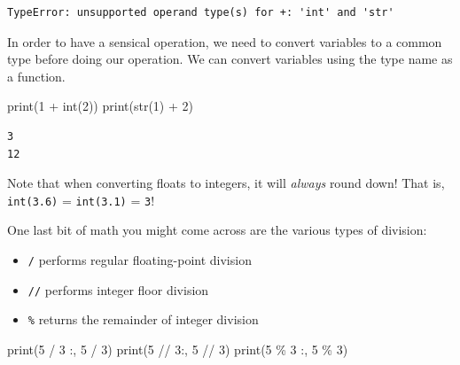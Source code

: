 \documentclass[
  letterpaper,
  DIV=11,
  numbers=noendperiod]{scrreprt}
\newenvironment{Shaded}{\begin{snugshade}}{\end{snugshade}}
\newcommand{\BuiltInTok}[1]{\textcolor[rgb]{0.00,0.23,0.31}{#1}}
\newcommand{\DecValTok}[1]{\textcolor[rgb]{0.68,0.00,0.00}{#1}}
\newcommand{\NormalTok}[1]{\textcolor[rgb]{0.00,0.23,0.31}{#1}}
\newcommand{\OperatorTok}[1]{\textcolor[rgb]{0.37,0.37,0.37}{#1}}
\newcommand{\StringTok}[1]{\textcolor[rgb]{0.13,0.47,0.30}{#1}}
\providecommand{\tightlist}{%
  \setlength{\itemsep}{0pt}\setlength{\parskip}{0pt}}\usepackage{longtable,booktabs,array}
\begin{document}
\begin{verbatim}
TypeError: unsupported operand type(s) for +: 'int' and 'str'
\end{verbatim}

In order to have a sensical operation, we need to convert variables to a
common type before doing our operation. We can convert variables using
the type name as a function.

\begin{Shaded}
\begin{Highlighting}[]
\BuiltInTok{print}\NormalTok{(}\DecValTok{1} \OperatorTok{+} \BuiltInTok{int}\NormalTok{(}\StringTok{\textquotesingle{}2\textquotesingle{}}\NormalTok{))}
\BuiltInTok{print}\NormalTok{(}\BuiltInTok{str}\NormalTok{(}\DecValTok{1}\NormalTok{) }\OperatorTok{+} \StringTok{\textquotesingle{}2\textquotesingle{}}\NormalTok{)}
\end{Highlighting}
\end{Shaded}

\begin{verbatim}
3
12
\end{verbatim}

\begin{tcolorbox}[enhanced jigsaw, rightrule=.15mm, opacitybacktitle=0.6, colback=white, toprule=.15mm, colframe=quarto-callout-tip-color-frame, bottomtitle=1mm, bottomrule=.15mm, arc=.35mm, coltitle=black, breakable, title=\textcolor{quarto-callout-tip-color}{\faLightbulb}\hspace{0.5em}{Int of a Float?}, titlerule=0mm, opacityback=0, colbacktitle=quarto-callout-tip-color!10!white, left=2mm, toptitle=1mm, leftrule=.75mm]
Note that when converting floats to integers, it will \emph{always}
round down! That is, \texttt{int(3.6)} = \texttt{int(3.1)} = \texttt{3}!
\end{tcolorbox}

One last bit of math you might come across are the various types of
division:

\begin{itemize}
\tightlist
\item
  \texttt{/} performs regular floating-point division
\item
  \texttt{//} performs integer floor division
\item
  \texttt{\%} returns the remainder of integer division
\end{itemize}

\begin{Shaded}
\begin{Highlighting}[]
\BuiltInTok{print}\NormalTok{(}\StringTok{\textquotesingle{}5 / 3 :\textquotesingle{}}\NormalTok{, }\DecValTok{5} \OperatorTok{/} \DecValTok{3}\NormalTok{)}
\BuiltInTok{print}\NormalTok{(}\StringTok{\textquotesingle{}5 // 3:\textquotesingle{}}\NormalTok{, }\DecValTok{5} \OperatorTok{//} \DecValTok{3}\NormalTok{)}
\BuiltInTok{print}\NormalTok{(}\StringTok{\textquotesingle{}5 \% 3 :\textquotesingle{}}\NormalTok{, }\DecValTok{5} \OperatorTok{\%} \DecValTok{3}\NormalTok{)}
\end{Highlighting}
\end{Shaded}
\end{document}
